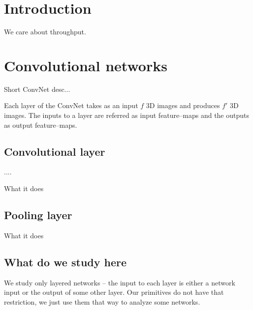 \documentclass[conference]{IEEEtran}
\begin{document}

\section{Introduction}


We care about throughput.

\section{Convolutional networks}

  Short ConvNet desc...

  Each layer of the ConvNet takes as an input $f$ 3D images and
  produces $f'$ 3D images.  The inputs to a layer are referred as
  input feature--maps and the outputs as output feature--maps.

\subsection{Convolutional layer}

  ....

  What it does

\subsection{Pooling layer}

  What it does

\subsection{What do we study here}

  We study only layered networks -- the input to each layer is either
  a network input or the output of some other layer.  Our primitives
  do not have that restriction, we just use them that way to analyze
  some networks.
\end{document}
